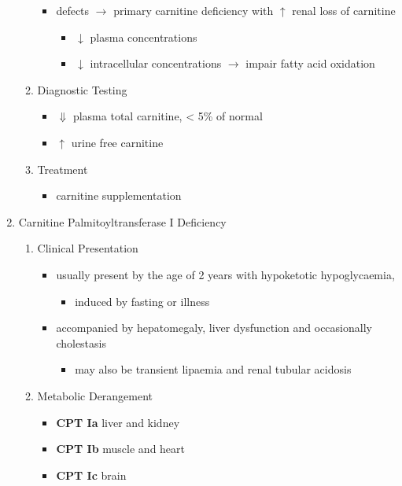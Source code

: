 \documentclass{scrartcl}
\begin{document}
\begin{enumerate}
\begin{enumerate}
\begin{itemize}
\begin{itemize}
\end{itemize}
\item defects \(\to\) primary carnitine deficiency with \(\uparrow\) renal loss of carnitine
\begin{itemize}
\item \(\downarrow\) plasma concentrations
\item \(\downarrow\) intracellular concentrations \(\to\) impair fatty acid
oxidation
\end{itemize}
\end{itemize}
\item Diagnostic Testing
\label{sec:orge18e956}
\begin{itemize}
\item \(\Downarrow\) plasma total carnitine, \textless{} 5\% of normal
\item \(\uparrow\) urine free carnitine
\end{itemize}
\item Treatment
\label{sec:orgf08c561}
\begin{itemize}
\item carnitine supplementation
\end{itemize}
\end{enumerate}
\item Carnitine Palmitoyltransferase I Deficiency
\label{sec:org16e01fb}
\begin{enumerate}
\item Clinical Presentation
\label{sec:orgab99633}
\begin{itemize}
\item usually present by the age of 2 years with hypoketotic hypoglycaemia,
\begin{itemize}
\item induced by fasting or illness
\end{itemize}
\item accompanied by hepatomegaly, liver dysfunction and occasionally cholestasis
\begin{itemize}
\item may also be transient lipaemia and renal tubular acidosis
\end{itemize}
\end{itemize}
\item Metabolic Derangement
\label{sec:org6a32dea}
\begin{itemize}
\item \textbf{CPT Ia} liver and kidney
\item \textbf{CPT Ib}  muscle and heart
\item \textbf{CPT Ic}  brain

\end{itemize}
\end{enumerate}
\end{enumerate}
\end{document}
